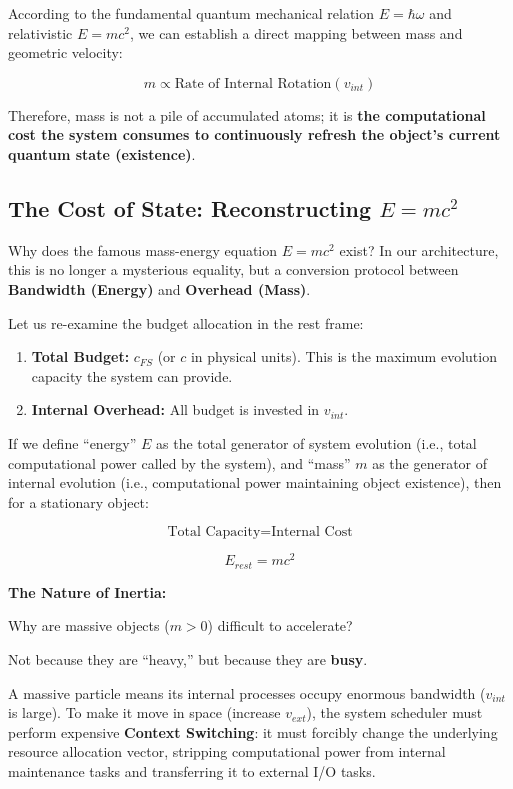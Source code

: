 According to the fundamental quantum mechanical relation \textbf{$E = \hbar \omega$} and relativistic \textbf{$E = mc^2$}, we can establish a direct mapping between mass and geometric velocity:

$$m \propto \text{Rate of Internal Rotation} (v_{int})$$

Therefore, mass is not a pile of accumulated atoms; it is \textbf{the computational cost the system consumes to continuously refresh the object's current quantum state (existence)}.

\subsection{The Cost of State: Reconstructing $E=mc^2$}

Why does the famous mass-energy equation \textbf{$E=mc^2$} exist? In our architecture, this is no longer a mysterious equality, but a conversion protocol between \textbf{Bandwidth (Energy)} and \textbf{Overhead (Mass)}.

Let us re-examine the budget allocation in the rest frame:

\begin{enumerate}
\item \textbf{Total Budget:} \textbf{$c_{FS}$} (or \textbf{$c$} in physical units). This is the maximum evolution capacity the system can provide.

\item \textbf{Internal Overhead:} All budget is invested in \textbf{$v_{int}$}.
\end{enumerate}

If we define ``energy'' \textbf{$E$} as the total generator of system evolution (i.e., total computational power called by the system), and ``mass'' \textbf{$m$} as the generator of internal evolution (i.e., computational power maintaining object existence), then for a stationary object:

$$\text{Total Capacity} = \text{Internal Cost}$$

$$E_{rest} = m c^2$$

\textbf{The Nature of Inertia:}

Why are massive objects (\textbf{$m > 0$}) difficult to accelerate?

Not because they are ``heavy,'' but because they are \textbf{busy}.

A massive particle means its internal processes occupy enormous bandwidth (\textbf{$v_{int}$} is large). To make it move in space (increase \textbf{$v_{ext}$}), the system scheduler must perform expensive \textbf{Context Switching}: it must forcibly change the underlying resource allocation vector, stripping computational power from internal maintenance tasks and transferring it to external I/O tasks.

